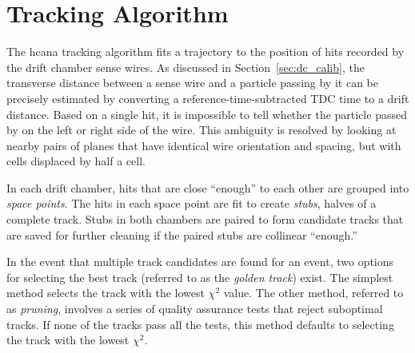 \section{Tracking Algorithm}
The hcana tracking algorithm fits a trajectory to the position of hits
recorded by the drift chamber sense wires.
As discussed in Section~\ref{sec:dc_calib}, the transverse distance between a
sense wire and a particle passing by it can be precisely estimated by
converting a reference-time-subtracted TDC time to a drift distance.
Based on a single hit, it is impossible to tell whether the particle passed by
on the left or right side of the wire.
This ambiguity is resolved by looking at nearby pairs of planes that have
identical wire orientation and spacing, but with cells displaced by half a
cell.


In each drift chamber, hits that are close ``enough'' to each other are grouped
into \textit{space points}.
The hits in each space point are fit to create \textit{stubs}, halves of a
complete track.
Stubs in both chambers are paired to form candidate tracks that are saved for
further cleaning if the paired stubs are collinear ``enough.''


In the event that multiple track candidates are found for an event, two options
for selecting the best track (referred to as the \textit{golden track}) exist.
The simplest method selects the track with the lowest $\chi^2$ value.
The other method, referred to as \textit{pruning}, involves a series of quality
assurance tests that reject suboptimal tracks.
If none of the tracks pass all the tests, this method defaults to selecting the
track with the lowest $\chi^2$.
